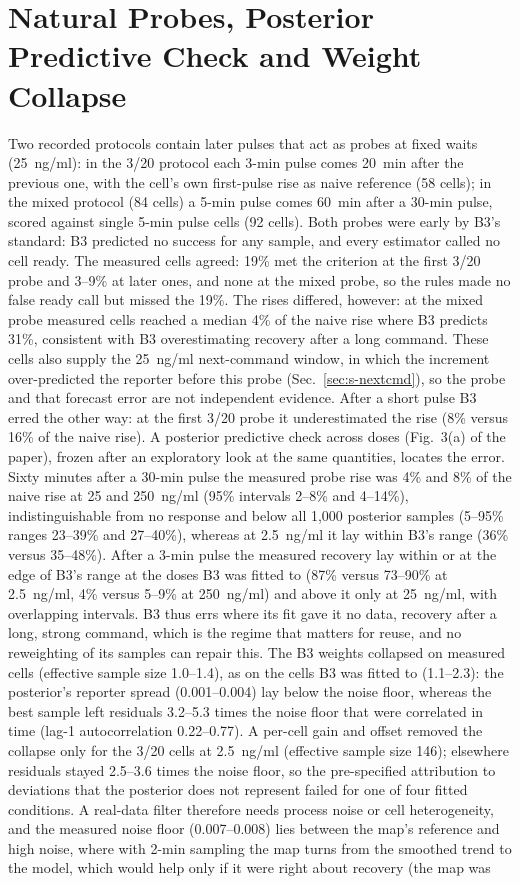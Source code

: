 \documentclass[conference]{IEEEtran}
\begin{document}
\section{Natural Probes, Posterior Predictive Check and Weight Collapse}
\label{sec:s-natural}
Two recorded protocols contain later pulses that act as probes at fixed waits (25~ng/ml): in the 3/20 protocol each 3-min pulse comes 20~min after the previous one, with the cell's own first-pulse rise as naive reference (58 cells); in the mixed protocol (84 cells) a 5-min pulse comes 60~min after a 30-min pulse, scored against single 5-min pulse cells (92 cells). Both probes were early by B3's standard: B3 predicted no success for any sample, and every estimator called no cell ready. The measured cells agreed: 19\% met the criterion at the first 3/20 probe and 3--9\% at later ones, and none at the mixed probe, so the rules made no false ready call but missed the 19\%. The rises differed, however: at the mixed probe measured cells reached a median 4\% of the naive rise where B3 predicts 31\%, consistent with B3 overestimating recovery after a long command. These cells also supply the 25~ng/ml next-command window, in which the increment over-predicted the reporter before this probe (Sec.~\ref{sec:s-nextcmd}), so the probe and that forecast error are not independent evidence. After a short pulse B3 erred the other way: at the first 3/20 probe it underestimated the rise (8\% versus 16\% of the naive rise). A posterior predictive check across doses (Fig.~3(a) of the paper), frozen after an exploratory look at the same quantities, locates the error. Sixty minutes after a 30-min pulse the measured probe rise was 4\% and 8\% of the naive rise at 25 and 250~ng/ml (95\% intervals 2--8\% and 4--14\%), indistinguishable from no response and below all 1,000 posterior samples (5--95\% ranges 23--39\% and 27--40\%), whereas at 2.5~ng/ml it lay within B3's range (36\% versus 35--48\%). After a 3-min pulse the measured recovery lay within or at the edge of B3's range at the doses B3 was fitted to (87\% versus 73--90\% at 2.5~ng/ml, 4\% versus 5--9\% at 250~ng/ml) and above it only at 25~ng/ml, with overlapping intervals. B3 thus errs where its fit gave it no data, recovery after a long, strong command, which is the regime that matters for reuse, and no reweighting of its samples can repair this. The B3 weights collapsed on measured cells (effective sample size 1.0--1.4), as on the cells B3 was fitted to (1.1--2.3): the posterior's reporter spread (0.001--0.004) lay below the noise floor, whereas the best sample left residuals 3.2--5.3 times the noise floor that were correlated in time (lag-1 autocorrelation 0.22--0.77). A per-cell gain and offset removed the collapse only for the 3/20 cells at 2.5~ng/ml (effective sample size 146); elsewhere residuals stayed 2.5--3.6 times the noise floor, so the pre-specified attribution to deviations that the posterior does not represent failed for one of four fitted conditions. A real-data filter therefore needs process noise or cell heterogeneity, and the measured noise floor (0.007--0.008) lies between the map's reference and high noise, where with 2-min sampling the map turns from the smoothed trend to the model, which would help only if it were right about recovery (the map was 
\end{document}

